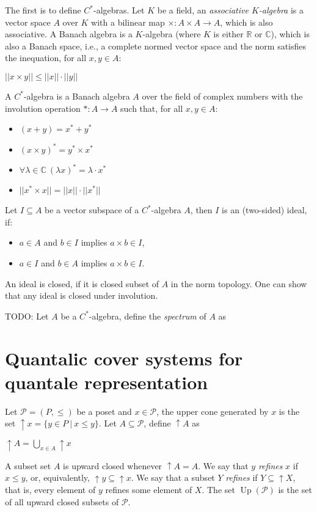 \documentclass[a4paper]{article}
\theoremstyle{defin}
\theoremstyle{theorem}
\theoremstyle{claim}
\theoremstyle{prop}
\theoremstyle{lemma}
\theoremstyle{fact}
\theoremstyle{ex}
\theoremstyle{col}
\begin{document}
The first is to define $C^{*}$-algebras. Let $K$ be a field, an \emph{associative $K$-algebra} is a vector space $A$ over $K$ with a bilinear map $\times : A \times A \to A$, which is also associative. A Banach algebra is a $K$-algebra (where $K$ is either $\mathbb{R}$ or $\mathbb{C}$), which is also a Banach space, i.e., a complete normed vector space and the norm satisfies the inequation, for all $x, y \in A$:
\begin{center}
$||x \times y|| \leq ||x|| \cdot ||y||$
\end{center}

A $C^{*}$-algebra is a Banach algebra $A$ over the field of complex numbers with the involution operation $* : A \to A$ such that, for all $x, y \in A$:
\begin{itemize}
\item $(x + y) = x^* + y^*$
\item $(x \times y)^* = y^* \times x^*$
\item $\forall \lambda \in \mathbb{C} \: (\lambda x)^* = \lambda \cdot x^*$
\item $||x^* \times x|| = ||x||\cdot||x^*||$
\end{itemize}

Let $I \subseteq A$ be a vector subspace of a $C^*$-algebra $A$, then $I$ is an (two-sided) ideal, if:
\begin{itemize}
\item $a \in A$ and $b \in I$ implies $a \times b \in I$,
\item $a \in I$ and $b \in A$ implies $a \times b \in I$.
\end{itemize}
An ideal is closed, if it is closed subset of $A$ in the norm topology. One can show that any ideal is closed under involution.

TODO: Let $A$ be a $C^*$-algebra, define the \emph{spectrum} of $A$ as

\section{Quantalic cover systems for quantale representation}

Let $\mathcal{P} = (P, \leq)$ be a poset and $x \in \mathcal{P}$, the upper cone generated by $x$ is the set $\uparrow x = \{ y \in P \: | \: x \leq y \}$. Let $A \subseteq \mathcal{P}$, define $\uparrow A$ as
\begin{center}
$\uparrow A = \bigcup \limits_{x \in A} \uparrow x$
\end{center}
A subset set $A$ is upward closed whenever $\uparrow A = A$.
We say that $y$ \emph{refines} $x$ if $x \leq y$, or, equivalently, $\uparrow y \subseteq \uparrow x$. We say that a subset $Y$ \emph{refines} if $Y \subseteq \uparrow X$, that is, every element of $y$ refines some element of $X$. The set $\operatorname{Up}(\mathcal{P})$ is the set of all upward closed subsets of $\mathcal{P}$.
\end{document}
